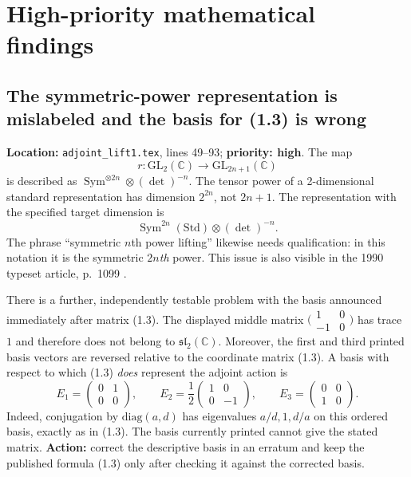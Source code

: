\documentclass[12pt,letterpaper]{article}
\newcommand{\Sym}{\operatorname{Sym}}
\begin{document}
\section{High-priority mathematical findings}

\subsection{The symmetric-power representation is mislabeled and the basis
for (1.3) is wrong}
\label{issue:adjoint}

\textbf{Location:} \texttt{adjoint\_lift1.tex}, lines 49--93;
\textbf{priority: high}. The map
\[
r:\mathrm{GL}_2(\mathbb C)\longrightarrow\mathrm{GL}_{2n+1}(\mathbb C)
\]
is described as
$\Sym^{\otimes 2n}\otimes(\det)^{-n}$. The tensor power of a
2-dimensional standard representation has dimension $2^{2n}$, not
$2n+1$. The representation with the specified target dimension is
\[
\boxed{\Sym^{2n}(\mathrm{Std})\otimes(\det)^{-n}}.
\]
The phrase ``symmetric $n$th power lifting'' likewise needs qualification:
in this notation it is the symmetric \emph{$2n$th} power. This issue is
also visible in the 1990 typeset article, p.~1099 \cite{Joyner1990}.

There is a further, independently testable problem with the basis announced
immediately after matrix (1.3). The displayed middle matrix
$\bigl(\begin{smallmatrix}1&0\\-1&0\end{smallmatrix}\bigr)$
has trace $1$ and therefore does not belong to
$\mathfrak{sl}_2(\mathbb C)$. Moreover, the first and third printed basis
vectors are reversed relative to the coordinate matrix (1.3). A basis
with respect to which (1.3) \emph{does} represent the adjoint action is
\[
E_1=\begin{pmatrix}0&1\\0&0\end{pmatrix},\qquad
E_2=\frac12\begin{pmatrix}1&0\\0&-1\end{pmatrix},\qquad
E_3=\begin{pmatrix}0&0\\1&0\end{pmatrix}.
\]
Indeed, conjugation by
$\mathrm{diag}(a,d)$ has eigenvalues $a/d,1,d/a$
on this ordered basis, exactly as in (1.3). The basis currently printed
cannot give the stated matrix. \textbf{Action:} correct the descriptive
basis in an erratum and keep the published formula (1.3) only after
checking it against the corrected basis.
\end{document}
